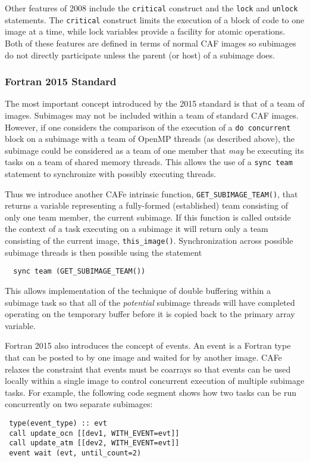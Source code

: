Other features of 2008 include the \texttt{critical} construct and the \texttt{lock} and
\texttt{unlock} statements.  The \texttt{critical} construct limits the execution of a
block of code to one image at a time, while lock variables provide a facility for atomic
operations.  Both of these features are defined in terms of normal CAF images so subimages
do not directly participate unless the parent (or host) of a subimage does.

\subsubsection{Fortran 2015 Standard}

The most important concept introduced by the 2015 standard is that of a team of images.
Subimages may not be included within a team of standard CAF images.  However, if one
considers the comparison of the execution of a \texttt{do concurrent} block on a subimage
with a team of OpenMP threads (as described above), the subimage could be considered as
a team of one member that \emph{may} be executing its tasks on a team of shared memory threads.
This allows the use of a \texttt{sync team} statement to synchronize with
possibly executing threads.

Thus we introduce another CAFe intrinsic function, \texttt{GET\_SUBIMAGE\_TEAM()}, that returns a
variable representing a fully-formed (established) team consisting of only one team
member, the current subimage.  If this function is called outside the context of a task
executing on a subimage it will return only a team consisting of the current image,
\texttt{this\_image()}.  Synchronization across possible subimage threads is then possible
using the statement
\begin{verbatim}
  sync team (GET_SUBIMAGE_TEAM())
\end{verbatim}
This allows implementation of the technique of double buffering within a subimage task
so that all of the \emph{potential} subimage threads will have completed operating on the
temporary buffer before it is copied back to the primary array variable.

Fortran 2015 also introduces the concept of events.  An event is a Fortran type that
can be posted to by one image and waited for by another image.  CAFe relaxes the
constraint that events must be coarrays so that events can be used locally within
a single image to control concurrent execution of multiple subimage tasks.  For example,
the following code segment shows how two tasks can be run concurrently on two separate
subimages:
\begin{verbatim}
 type(event_type) :: evt
 call update_ocn [[dev1, WITH_EVENT=evt]]
 call update_atm [[dev2, WITH_EVENT=evt]]
 event wait (evt, until_count=2)
\end{verbatim}

